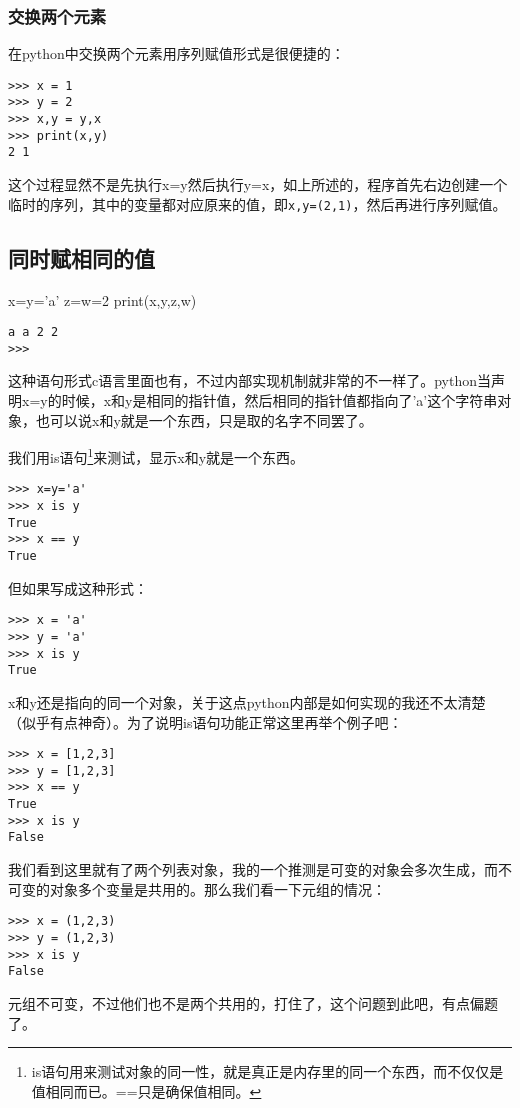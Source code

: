 \documentclass[12pt,oneside]{book}
\begin{document}
\begin{common-format}
\subsubsection{交换两个元素}
在python中交换两个元素用序列赋值形式是很便捷的：
\begin{Verbatim}
>>> x = 1
>>> y = 2
>>> x,y = y,x
>>> print(x,y)
2 1
\end{Verbatim}
这个过程显然不是先执行x=y然后执行y=x，如上所述的，程序首先右边创建一个临时的序列，其中的变量都对应原来的值，即\verb+x,y=(2,1)+，然后再进行序列赋值。



\subsection{同时赋相同的值}
\begin{tcbpython}[]
x=y='a'
z=w=2
print(x,y,z,w)
\end{tcbpython}
\begin{Verbatim}
a a 2 2
>>> 
\end{Verbatim}


这种语句形式c语言里面也有，不过内部实现机制就非常的不一样了。python当声明x=y的时候，x和y是相同的指针值，然后相同的指针值都指向了'a'这个字符串对象，也可以说x和y就是一个东西，只是取的名字不同罢了。

我们用is语句\footnote{is语句用来测试对象的同一性，就是真正是内存里的同一个东西，而不仅仅是值相同而已。==只是确保值相同。}来测试，显示x和y就是一个东西。
\begin{Verbatim}
>>> x=y='a'
>>> x is y
True
>>> x == y
True
\end{Verbatim}


但如果写成这种形式：
\begin{Verbatim}
>>> x = 'a'
>>> y = 'a'
>>> x is y
True
\end{Verbatim}
x和y还是指向的同一个对象，关于这点python内部是如何实现的我还不太清楚（似乎有点神奇）。为了说明is语句功能正常这里再举个例子吧：
\begin{Verbatim}
>>> x = [1,2,3]
>>> y = [1,2,3]
>>> x == y
True
>>> x is y
False
\end{Verbatim}
我们看到这里就有了两个列表对象，我的一个推测是可变的对象会多次生成，而不可变的对象多个变量是共用的。那么我们看一下元组的情况：
\begin{Verbatim}
>>> x = (1,2,3)
>>> y = (1,2,3)
>>> x is y
False
\end{Verbatim}
元组不可变，不过他们也不是两个共用的，打住了，这个问题到此吧，有点偏题了。




\end{common-format}
\end{document}

